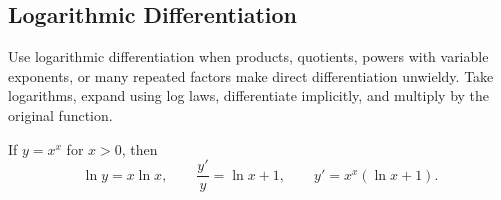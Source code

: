 \subsection*{Logarithmic Differentiation}

\begin{remark*}[Method]
Use logarithmic differentiation when products, quotients, powers with
variable exponents, or many repeated factors make direct differentiation
unwieldy. Take logarithms, expand using log laws, differentiate implicitly,
and multiply by the original function.
\end{remark*}

\begin{example*}
If \(y=x^x\) for \(x>0\), then
\[
  \ln y=x\ln x,
  \qquad
  \frac{y'}{y}=\ln x+1,
  \qquad
  y'=x^x(\ln x+1).
\]
\end{example*}
